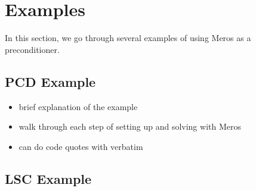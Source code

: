 \section{Examples}

In this section, we go through several examples of using Meros as a
preconditioner. 

\subsection{PCD Example}
\begin{itemize}
\item brief explanation of the example
\item walk through each step of setting up and solving with Meros
\item can do code quotes with verbatim
\end{itemize}



\subsection{LSC Example}

